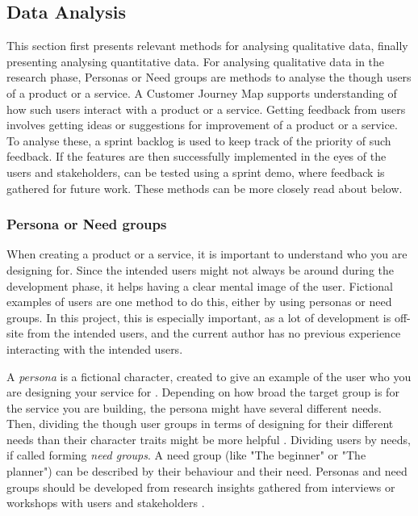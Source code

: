 \subsection{Data Analysis}\label{sec:data-analysis}

This section first presents relevant methods for analysing qualitative data, finally presenting analysing quantitative data. For analysing qualitative data in the research phase, Personas or Need groups are methods to analyse the though users of a product or a service. A Customer Journey Map supports understanding of how such users interact with a product or a service. Getting feedback from users involves getting ideas or suggestions for improvement of a product or a service. To analyse these, a sprint backlog is used to keep track of the priority of such feedback. If the features are then successfully implemented in the eyes of the users and stakeholders, can be tested using a sprint demo, where feedback is gathered for future work. These methods can be more closely read about below.

\subsubsection{Persona or Need groups}
When creating a product or a service, it is important to understand who you are designing for. Since the intended users might not always be around during the development phase, it helps having a clear mental image of the user. Fictional examples of users are one method to do this, either by using personas or need groups.  In this project, this is especially important, as a lot of development is off-site from the intended users, and the current author has no previous experience interacting with the intended users.

A \textit{persona} is a fictional character, created to give an example of the user who you are designing your service for \citep{stickdorn}. Depending on how broad the target group is for the service you are building, the persona might have several different needs. Then, dividing the though user groups in terms of designing for their different needs than their character traits might be more helpful \citep{expedition-mondial}. Dividing users by needs, if called forming \textit{need groups}. A need group (like "The beginner" or "The planner") can be described by their behaviour and their need. Personas and need groups should be developed from research insights gathered from interviews or workshops with users and stakeholders \citep{stickdorn}.

